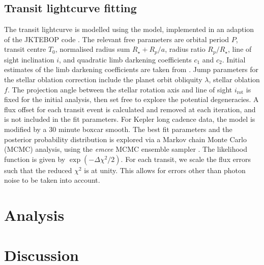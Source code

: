 \documentclass[apjl]{emulateapj}
\begin{document}
\subsection{Transit lightcurve fitting}
\label{sec:transit-light-curve}

The transit lightcurve is modelled using the
\citet{1972ApJ...174..617N} model, implemented in an adaption of the
JKTEBOP code \citep{1981AJ.....86..102P,2004MNRAS.351.1277S}. The
relevant free parameters are orbital period $P$, transit centre $T_0$,
normalised radius sum $R_\star+R_p / a$, radius ratio $R_p/R_\star$,
line of sight inclination $i$, and quadratic limb darkening
coefficients $c_1$ and $c_2$. Initial estimates of the limb darkening
coefficients are taken from \citet{2010A&amp;A...510A..21S}. Jump
parameters for the stellar oblation correction include the planet
orbit obliquity $\lambda$, stellar oblation $f$. The projection angle
between the stellar rotation axis and line of sight $i_\text{rot}$ is
fixed for the initial analysis, then set free to explore the potential
degeneracies. A flux offset for each transit event is calculated and
removed at each iteration, and is not included in the fit
parameters. For Kepler long cadence data, the model is modified by a
30 minute boxcar smooth. The best fit parameters and the posterior
probability distribution is explored via a Markov chain Monte Carlo
(MCMC) analysis, using the \emph{emcee} MCMC ensemble sampler
\citep{2012arXiv1202.3665F}. The likelihood function is given by
$\exp(-\Delta\chi^2/2)$. For each transit, we scale the flux errors such
that the reduced $\chi^2$ is at unity. This allows for errors other
than photon noise to be taken into account.




\section{Analysis}
\label{sec:analysis}

\section{Discussion}
\label{sec:discussion}



\end{document}
